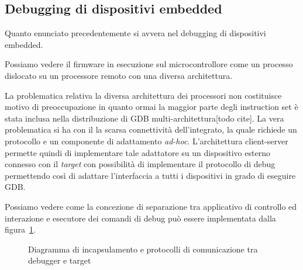 \subsection{Debugging di dispositivi embedded}

Quanto enunciato precedentemente si avvera nel debugging di dispositivi embedded. 

Possiamo vedere il firmware in esecuzione sul microcontrollore come un processo dislocato su un processore remoto con una diversa architettura.

La problematica relativa la diversa architettura dei processori non costituisce motivo di preoccupazione in quanto ormai la maggior parte degli instruction set è stata inclusa nella distribuzione di GDB multi-architettura[todo cite].
La vera problematica si ha con il la scarsa connettività dell'integrato, la quale richiede un protocollo e un componente di adattamento \textit{ad-hoc}.
L'architettura client-server permette quindi di implementare tale adattatore su un dispositivo esterno connesso con il \textit{target} con possibilità di implementare il protocollo di debug permettendo così di adattare l'interfaccia a tutti i dispositivi in grado di eseguire GDB.

Possiamo vedere come la concezione di separazione tra applicativo di controllo ed interazione e esecutore dei comandi di debug può essere implementata dalla figura~\ref{fig:gdb-server-tunnels}.

\begin{figure}
    \centering
    \caption[]{Diagramma di incapsulamento e protocolli di comunicazione tra debugger e target}\label{fig:gdb-server-tunnels}
\end{figure}

